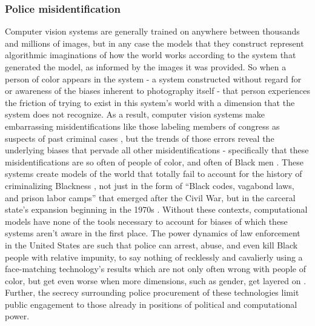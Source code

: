 \documentclass[manuscript,screen]{acmart}
\begin{document}
\subsubsection{Police misidentification}
Computer vision systems are generally trained on anywhere between thousands and millions of images, but in any case the models that they construct represent algorithmic imaginations of how the world works according to the system that generated the model, as informed by the images it was provided.
So when a person of color appears in the system - a system constructed without regard for or awareness of the biases inherent to photography itself
\cite{benjamin2019race,photographySkin}
 - that person experiences the friction of trying to exist in this system's world with a dimension that the system does not recognize.
 As a result, computer vision systems make embarrassing misidentifications like those labeling members of congress as suspects of past criminal cases
\cite{membersOfCongress}, but the trends of those errors reveal the underlying biases that pervade all other misidentifications - specifically that these misidentifications are so often of people of color, and often of Black men
\cite{clearviewArrest}.
These systems create models of the world that totally fail to account for the history of criminalizing Blackness
\cite{smiley2016brute},
not just in the form of ``Black codes, vagabond laws, and prison labor camps'' that emerged after the Civil War, but in the carceral state's expansion beginning in the 1970s
\cite{bell2017criminalization}.
Without these contexts, computational models have none of the tools necessary to account for biases of which these systems aren't aware in the first place.
The power dynamics of law enforcement in the United States are such that police can arrest, abuse, and even kill Black people with relative impunity, to say nothing of recklessly and cavalierly using a face-matching technology's results which are not only often wrong with people of color, but get even worse when more dimensions, such as gender, get layered on
\cite{buolamwini2018gender}.
Further, the secrecy surrounding police procurement of these technologies limit public engagement to those already in positions of political and computational power.
\end{document}
